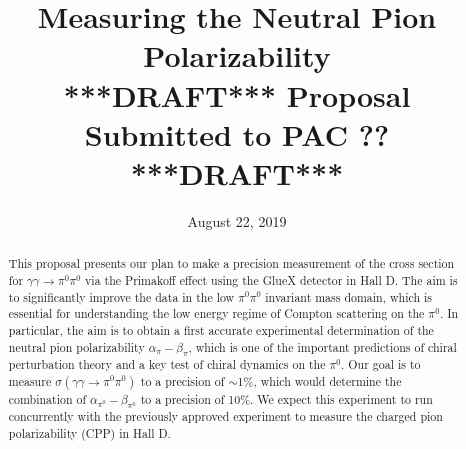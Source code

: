 \documentclass[letterpaper,12pt]{article}
\date{August 22, 2019}
\title{\Large \textbf{Measuring the Neutral Pion Polarizability}\\
\large{***DRAFT*** Proposal Submitted to PAC ?? ***DRAFT***}
}
\begin{document}
\setlength{\parindent}{0in}


\maketitle

\thispagestyle{empty}


\begin{abstract}
This proposal presents our plan to make a precision measurement of the cross section for $\gamma \gamma \rightarrow \pi^0 \pi^0$ via the Primakoff effect using the GlueX detector in Hall D. The aim is to significantly improve the data in the low $\pi^0\pi^0$ invariant mass domain, which is essential for understanding the low energy regime of Compton scattering on the $\pi^0$. In particular, the aim is to obtain a first accurate experimental determination of the neutral pion polarizability $\alpha_\pi - \beta_\pi$, which is one of the important predictions of chiral perturbation theory and a key test of chiral dynamics on the $\pi^0$.  Our goal is to measure $\sigma(\gamma\gamma\rightarrow\pi^0\pi^0)$ to a precision of $\sim$1\%, which would determine the combination of $\alpha_{\pi^0}-\beta_{\pi^0}$ to a precision of 10\%. We expect this experiment to run concurrently with the previously approved experiment to measure the charged pion polarizability (CPP) \cite{CPPexp} in Hall D.
\end{abstract}

\newpage
\end{document}
